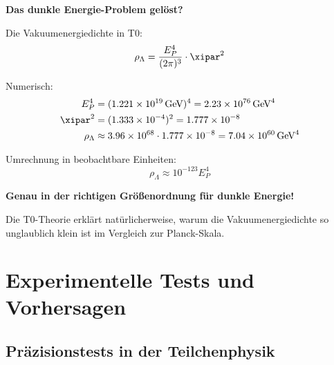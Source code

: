 	\begin{erkenntnis}
		\textbf{Das dunkle Energie-Problem gelöst?}
		
		Die Vakuumenergiedichte in T0:
		\begin{equation}
			\rho_{\Lambda} = \frac{E_P^4}{(2\pi)^3} \cdot \xipar^2
		\end{equation}
		
		Numerisch:
		\begin{align}
			E_P^4 &= (1.221 \times 10^{19}\, \text{GeV})^4 = 2.23 \times 10^{76}\, \text{GeV}^4 \\
			\xipar^2 &= (1.333 \times 10^{-4})^2 = 1.777 \times 10^{-8} \\
			\rho_{\Lambda} &\approx 3.96 \times 10^{68} \cdot 1.777 \times 10^{-8} = 7.04 \times 10^{60}\, \text{GeV}^4
		\end{align}
		
		Umrechnung in beobachtbare Einheiten:
		\begin{equation}
			\rho_{\Lambda} \approx 10^{-123} E_P^4
		\end{equation}
		
		\textbf{Genau in der richtigen Größenordnung für dunkle Energie!}
		
		Die T0-Theorie erklärt natürlicherweise, warum die Vakuumenergiedichte so unglaublich klein ist im Vergleich zur Planck-Skala.
	\end{erkenntnis}
	
	\section{Experimentelle Tests und Vorhersagen}
	
	\subsection{Präzisionstests in der Teilchenphysik}
	

